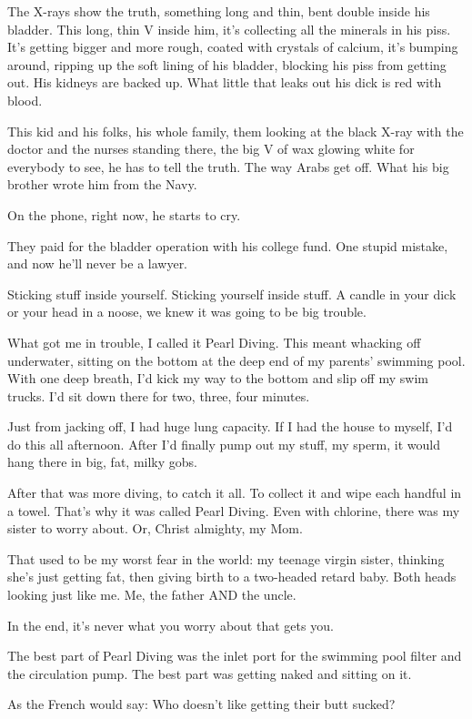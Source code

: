 \documentclass[10pt,a5paper,twoside]{book}
\begin{document}
The X-rays show the truth, something long and thin, bent double inside his bladder. This long, thin V inside him, it's collecting all the minerals in his piss. It's getting bigger and more rough, coated with crystals of calcium, it's bumping around, ripping up the soft lining of his bladder, blocking his piss from getting out. His kidneys are backed up. What little that leaks out his dick is red with blood.

This kid and his folks, his whole family, them looking at the black X-ray with the doctor and the nurses standing there, the big V of wax glowing white for everybody to see, he has to tell the truth. The way Arabs get off. What his big brother wrote him from the Navy.

On the phone, right now, he starts to cry.

They paid for the bladder operation with his college fund. One stupid mistake, and now he'll never be a lawyer.

Sticking stuff inside yourself. Sticking yourself inside stuff. A candle in your dick or your head in a noose, we knew it was going to be big trouble.

What got me in trouble, I called it Pearl Diving. This meant whacking off underwater, sitting on the bottom at the deep end of my parents' swimming pool. With one deep breath, I'd kick my way to the bottom and slip off my swim trucks. I'd sit down there for two, three, four minutes.

Just from jacking off, I had huge lung capacity. If I had the house to myself, I'd do this all afternoon. After I'd finally pump out my stuff, my sperm, it would hang there in big, fat, milky gobs.

After that was more diving, to catch it all. To collect it and wipe each handful in a towel. That's why it was called Pearl Diving. Even with chlorine, there was my sister to worry about. Or, Christ almighty, my Mom.

That used to be my worst fear in the world: my teenage virgin sister, thinking she's just getting fat, then giving birth to a two-headed retard baby. Both heads looking just like me. Me, the father AND the uncle.

In the end, it's never what you worry about that gets you.

The best part of Pearl Diving was the inlet port for the swimming pool filter and the circulation pump. The best part was getting naked and sitting on it.

As the French would say: Who doesn't like getting their butt sucked?
\end{document}
